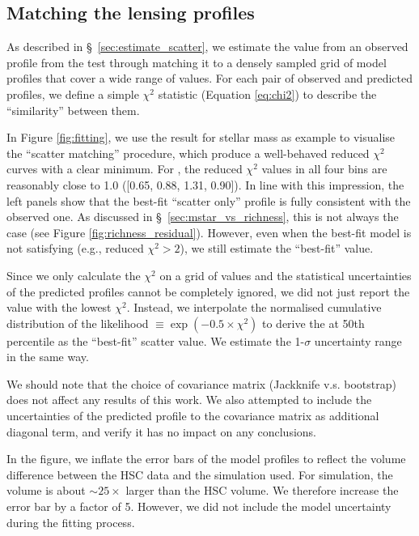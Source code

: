 \documentclass[fleqn,usenatbib,useAMS]{mnras}
\begin{document}
\begin{CJK*}{UTF8}{gbsn}
\section{Matching the lensing profiles}
    \label{app:fitting}

    As described in \S\ \ref{sec:estimate_scatter}, we estimate the \sigmh{} value
    from an observed \dsigma{} profile from the \topn{} test through matching it to a densely
    sampled grid of model \dsigma{} profiles that cover a wide range of \sigmh{}
    values.
    For each pair of observed and predicted \dsigma{} profiles, we define a simple $\chi^2$
    statistic (Equation \ref{eq:chi2}) to describe the ``similarity'' between them.

    In Figure \ref{fig:fitting}, we use the \topn{} result for  stellar mass as example
    to visualise the ``scatter matching'' procedure, which produce a well-behaved reduced $\chi^2$
    curves with a clear minimum.
    For , the reduced $\chi^2$ values in all four \topn{} bins are reasonably close
    to 1.0 ([0.65, 0.88, 1.31, 0.90]).
    In line with this impression, the left panels show that the best-fit ``scatter only'' \dsigma{}
    profile is fully consistent with the observed one.
    As discussed in \S\ \ref{sec:mstar_vs_richness}, this is not always the case (see
    Figure \ref{fig:richness_residual}).
    However, even when the best-fit model is not satisfying (e.g., reduced $\chi^2 >2$), we still
    estimate the ``best-fit'' \sigmh{} value.

    Since we only calculate the $\chi^2$ on a grid of \sigmh{} values and the statistical
    uncertainties of the predicted \dsigma{} profiles cannot be completely ignored, we did not
    just report the \sigmh{} value with the lowest $\chi^2$.
    Instead, we interpolate the normalised cumulative distribution of the likelihood $\equiv
    \exp{(-0.5 \times \chi^2)}$ to derive the \sigmh{} at 50th percentile as the ``best-fit''
    scatter value.
    We estimate the 1-$\sigma$ uncertainty range in the same way.

    We should note that the choice of covariance matrix (Jackknife v.s. bootstrap) does not
    affect any results of this work.
    We also attempted to include the uncertainties of the predicted \dsigma{} profile to the
    covariance matrix as additional diagonal term, and verify it has no impact on any
    conclusions.

    In the figure, we inflate the error bars of the
    model profiles to reflect the volume difference between the HSC data and the simulation
    used. For  simulation, the volume is about $\sim 25 \times$ larger than the HSC
    volume. We therefore increase the error bar by a factor of 5. However, we did not
    include the model uncertainty during the fitting process. 


\end{CJK*}
\end{document}
